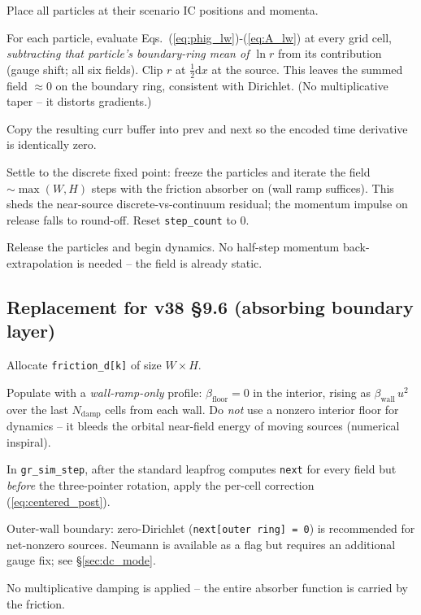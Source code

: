 \documentclass[11pt,a4paper]{article}
\newcommand{\dd}{\mathrm{d}}
\newcommand{\half}{\tfrac{1}{2}}
\begin{document}
\begin{algsteps}
  \item Place all particles at their scenario IC positions and momenta.
  \item For each particle, evaluate Eqs.~(\ref{eq:phig_lw})-(\ref{eq:A_lw})
    at every grid cell, \emph{subtracting that particle's boundary-ring
    mean of $\ln r$} from its contribution (gauge shift; all six fields).
    Clip $r$ at $\half\dd x$ at the source.  This leaves the summed field
    $\approx 0$ on the boundary ring, consistent with Dirichlet.  (No
    multiplicative taper -- it distorts gradients.)
  \item Copy the resulting curr buffer into prev and next so the
    encoded time derivative is identically zero.
  \item Settle to the discrete fixed point: freeze the particles and
    iterate the field $\sim\!\max(W,H)$ steps with the friction absorber
    on (wall ramp suffices).  This sheds the near-source
    discrete-vs-continuum residual; the momentum impulse on release
    falls to round-off.  Reset \texttt{step\_count} to 0.
  \item Release the particles and begin dynamics.  No half-step momentum
    back-extrapolation is needed -- the field is already static.
\end{algsteps}

\subsection*{Replacement for v38 \S 9.6 (absorbing boundary layer)}

\begin{algsteps}
  \item Allocate \texttt{friction\_d[k]} of size $W \times H$.
  \item Populate with a \emph{wall-ramp-only} profile: $\beta_\text{floor}
    = 0$ in the interior, rising as $\beta_\text{wall}\,u^2$ over the last
    $N_\text{damp}$ cells from each wall.  Do \emph{not} use a nonzero
    interior floor for dynamics -- it bleeds the orbital near-field energy
    of moving sources (numerical inspiral).
  \item In \texttt{gr\_sim\_step}, after the standard leapfrog
    computes \texttt{next} for every field but \emph{before} the
    three-pointer rotation, apply the per-cell correction
    (\ref{eq:centered_post}).
  \item Outer-wall boundary: zero-Dirichlet (\texttt{next[outer ring]
    = 0}) is recommended for net-nonzero sources.  Neumann is
    available as a flag but requires an additional gauge fix; see
    \S\ref{sec:dc_mode}.
  \item No multiplicative damping is applied -- the entire absorber
    function is carried by the friction.
\end{algsteps}
\end{document}
